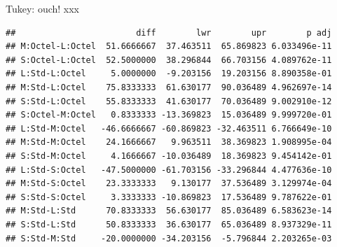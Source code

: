 \documentclass[ignorenonframetext,]{beamer}
\newenvironment{Shaded}{\begin{snugshade}}{\end{snugshade}}
\newcommand{\DataTypeTok}[1]{\textcolor[rgb]{0.13,0.29,0.53}{#1}}
\newcommand{\FloatTok}[1]{\textcolor[rgb]{0.00,0.00,0.81}{#1}}
\newcommand{\KeywordTok}[1]{\textcolor[rgb]{0.13,0.29,0.53}{\textbf{#1}}}
\newcommand{\NormalTok}[1]{#1}
\newcommand{\OperatorTok}[1]{\textcolor[rgb]{0.81,0.36,0.00}{\textbf{#1}}}
\newcommand{\StringTok}[1]{\textcolor[rgb]{0.31,0.60,0.02}{#1}}
\begin{document}
\begin{frame}[fragile]{Tukey: ouch! xxx}
\protect\hypertarget{tukey-ouch-xxx}{}

\scriptsize

\begin{Shaded}
\end{Shaded}

\begin{verbatim}
##                        diff        lwr        upr        p adj
## M:Octel-L:Octel  51.6666667  37.463511  65.869823 6.033496e-11
## S:Octel-L:Octel  52.5000000  38.296844  66.703156 4.089762e-11
## L:Std-L:Octel     5.0000000  -9.203156  19.203156 8.890358e-01
## M:Std-L:Octel    75.8333333  61.630177  90.036489 4.962697e-14
## S:Std-L:Octel    55.8333333  41.630177  70.036489 9.002910e-12
## S:Octel-M:Octel   0.8333333 -13.369823  15.036489 9.999720e-01
## L:Std-M:Octel   -46.6666667 -60.869823 -32.463511 6.766649e-10
## M:Std-M:Octel    24.1666667   9.963511  38.369823 1.908995e-04
## S:Std-M:Octel     4.1666667 -10.036489  18.369823 9.454142e-01
## L:Std-S:Octel   -47.5000000 -61.703156 -33.296844 4.477636e-10
## M:Std-S:Octel    23.3333333   9.130177  37.536489 3.129974e-04
## S:Std-S:Octel     3.3333333 -10.869823  17.536489 9.787622e-01
## M:Std-L:Std      70.8333333  56.630177  85.036489 6.583623e-14
## S:Std-L:Std      50.8333333  36.630177  65.036489 8.937329e-11
## S:Std-M:Std     -20.0000000 -34.203156  -5.796844 2.203265e-03
\end{verbatim}

\normalsize

\end{frame}
\end{document}

